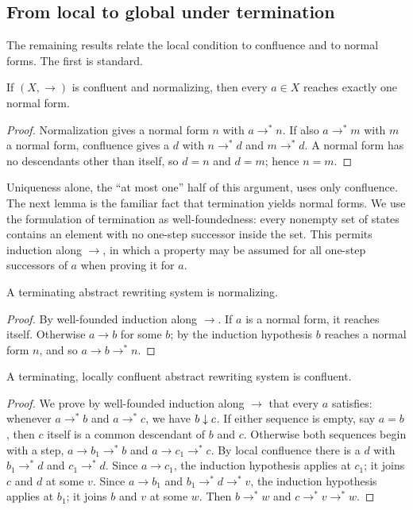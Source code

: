 \subsection{From local to global under termination}

The remaining results relate the local condition to confluence and to normal forms. The first is standard.

\begin{proposition}
\label{prop:confluence-normalization-unique-normal-form}
If $(X,\to)$ is confluent and normalizing, then every $a \in X$ reaches exactly one normal form.
\end{proposition}

\begin{proof}
Normalization gives a normal form $n$ with $a \to^{*} n$. If also $a \to^{*} m$ with $m$ a normal form, confluence gives a $d$ with $n \to^{*} d$ and $m \to^{*} d$. A normal form has no descendants other than itself, so $d = n$ and $d = m$; hence $n = m$.
\end{proof}

Uniqueness alone, the ``at most one'' half of this argument, uses only confluence. The next lemma is the familiar fact that termination yields normal forms. We use the formulation of termination as well-foundedness: every nonempty set of states contains an element with no one-step successor inside the set. This permits induction along $\to$, in which a property may be assumed for all one-step successors of $a$ when proving it for $a$.

\begin{lemma}
\label{lem:terminating-normalizing}
A terminating abstract rewriting system is normalizing.
\end{lemma}

\begin{proof}
By well-founded induction along $\to$. If $a$ is a normal form, it reaches itself. Otherwise $a \to b$ for some $b$; by the induction hypothesis $b$ reaches a normal form $n$, and so $a \to b \to^{*} n$.
\end{proof}

\begin{theorem}
\label{thm:newman}
A terminating, locally confluent abstract rewriting system is confluent.
\end{theorem}

\begin{proof}
We prove by well-founded induction along $\to$ that every $a$ satisfies: whenever $a \to^{*} b$ and $a \to^{*} c$, we have $b \mathrel{\downarrow} c$. If either sequence is empty, say $a = b$, then $c$ itself is a common descendant of $b$ and $c$. Otherwise both sequences begin with a step, $a \to b_1 \to^{*} b$ and $a \to c_1 \to^{*} c$. By local confluence there is a $d$ with $b_1 \to^{*} d$ and $c_1 \to^{*} d$. Since $a \to c_1$, the induction hypothesis applies at $c_1$; it joins $c$ and $d$ at some $v$. Since $a \to b_1$ and $b_1 \to^{*} d \to^{*} v$, the induction hypothesis applies at $b_1$; it joins $b$ and $v$ at some $w$. Then $b \to^{*} w$ and $c \to^{*} v \to^{*} w$.
\end{proof}

